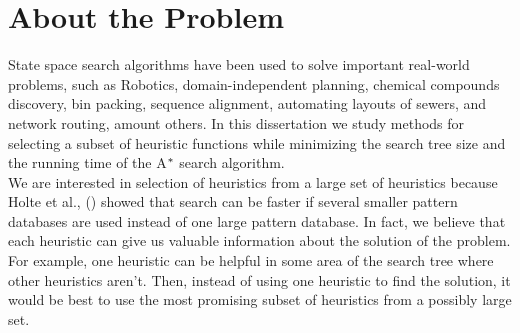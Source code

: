 

\chapter{About the Problem}\label{aboutTheProblem}
\noindent
State space search algorithms have been used to solve important real-world problems, such as Robotics, domain-independent planning, chemical compounds discovery, bin packing, sequence alignment, automating layouts of sewers, and network routing, amount others. In this dissertation we study methods for selecting a subset of heuristic functions while minimizing the search tree size and the running time of the A$\sp{*}$ search algorithm.\\

We are interested in selection of heuristics from a large set of heuristics because Holte et al., (\citeyear{holte2006maximizing}) showed that search can be faster if several smaller pattern databases are used instead of one large pattern database. In fact, we believe that each heuristic can give us valuable information about the solution of the problem. For example, one heuristic can be helpful in some area of the search tree where other heuristics aren't. Then, instead of using one heuristic to find the solution, it would be best to use the most promising subset of heuristics from a possibly large set.\\

